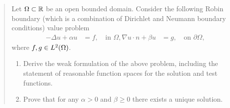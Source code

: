 \documentclass[english]{exercise}
\begin{document}
	\begin{quote}
		Let \(\Omega \subset \mathbb{R}\) be an open bounded domain.
		Consider the following Robin boundary (which is a combination of Dirichlet and Neumann boundary conditions) value problem
		\begin{align*}
			-\Delta u + \alpha u &= f, \quad \text{in }\Omega,
			\nabla u \cdot n + \beta u &= g, \quad \text{on }\partial\Omega,
		\end{align*}
		where \(f, g \in L^2\parentheses*{\Omega}\).
		\begin{enumerate}
			\item Derive the weak formulation of the above problem, including the statement of reasonable function spaces for the solution and test functions.
			\item Prove that for any \(\alpha > 0\) and \(\beta \ge 0\) there exists a unique solution.
		\end{enumerate}
	\end{quote}
\end{document}
